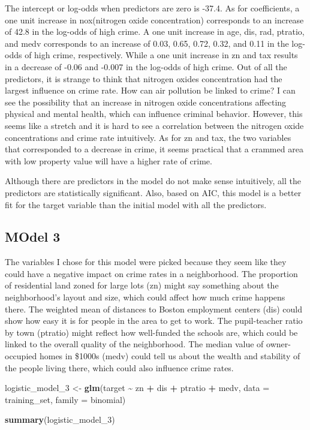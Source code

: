 \documentclass[
]{article}
\newenvironment{Shaded}{\begin{snugshade}}{\end{snugshade}}
\newcommand{\AttributeTok}[1]{\textcolor[rgb]{0.13,0.29,0.53}{#1}}
\newcommand{\FunctionTok}[1]{\textcolor[rgb]{0.13,0.29,0.53}{\textbf{#1}}}
\newcommand{\NormalTok}[1]{#1}
\newcommand{\OtherTok}[1]{\textcolor[rgb]{0.56,0.35,0.01}{#1}}
\newcommand{\SpecialCharTok}[1]{\textcolor[rgb]{0.81,0.36,0.00}{\textbf{#1}}}
\begin{document}
The intercept or log-odds when predictors are zero is -37.4. As for
coefficients, a one unit increase in nox(nitrogen oxide concentration)
corresponds to an increase of 42.8 in the log-odds of high crime. A one
unit increase in age, dis, rad, ptratio, and medv corresponds to an
increase of 0.03, 0.65, 0.72, 0.32, and 0.11 in the log-odds of high
crime, respectively. While a one unit increase in zn and tax results in
a decrease of -0.06 and -0.007 in the log-odds of high crime. Out of all
the predictors, it is strange to think that nitrogen oxides
concentration had the largest influence on crime rate. How can air
pollution be linked to crime? I can see the possibility that an increase
in nitrogen oxide concentrations affecting physical and mental health,
which can influence criminal behavior. However, this seems like a
stretch and it is hard to see a correlation between the nitrogen oxide
concentrations and crime rate intuitively. As for zn and tax, the two
variables that corresponded to a decrease in crime, it seems practical
that a crammed area with low property value will have a higher rate of
crime.

Although there are predictors in the model do not make sense
intuitively, all the predictors are statistically significant. Also,
based on AIC, this model is a better fit for the target variable than
the initial model with all the predictors.

\hypertarget{model-3}{%
\subsection{MOdel 3}\label{model-3}}

The variables I chose for this model were picked because they seem like
they could have a negative impact on crime rates in a neighborhood. The
proportion of residential land zoned for large lots (zn) might say
something about the neighborhood's layout and size, which could affect
how much crime happens there. The weighted mean of distances to Boston
employment centers (dis) could show how easy it is for people in the
area to get to work. The pupil-teacher ratio by town (ptratio) might
reflect how well-funded the schools are, which could be linked to the
overall quality of the neighborhood. The median value of owner-occupied
homes in \$1000s (medv) could tell us about the wealth and stability of
the people living there, which could also influence crime rates.

\begin{Shaded}
\begin{Highlighting}[]
\NormalTok{logistic\_model\_3 }\OtherTok{\textless{}{-}} \FunctionTok{glm}\NormalTok{(target }\SpecialCharTok{\textasciitilde{}}\NormalTok{ zn }\SpecialCharTok{+}\NormalTok{ dis }\SpecialCharTok{+}\NormalTok{ ptratio }\SpecialCharTok{+}\NormalTok{ medv, }\AttributeTok{data =}\NormalTok{ training\_set, }\AttributeTok{family =}\NormalTok{ binomial)}

\FunctionTok{summary}\NormalTok{(logistic\_model\_3)}
\end{Highlighting}
\end{Shaded}
\end{document}

